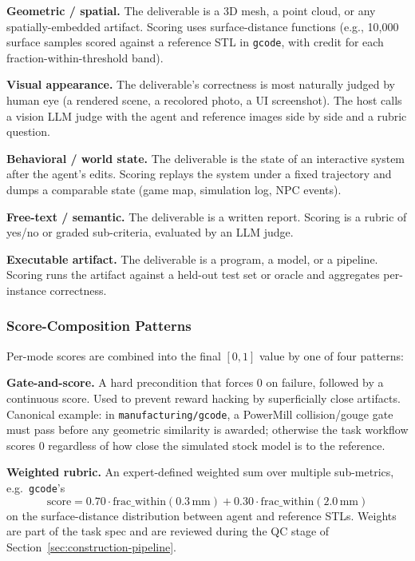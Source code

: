\documentclass{llmxive}
\begin{document}
\noindent \textbf{Geometric / spatial.} The deliverable is a 3D mesh, a point cloud, or any spatially-embedded artifact. Scoring uses surface-distance functions (e.g., 10{,}000 surface samples scored against a reference STL in \texttt{gcode}, with credit for each fraction-within-threshold band).

\noindent \textbf{Visual appearance.} The deliverable's correctness is most naturally judged by human eye (a rendered scene, a recolored photo, a UI screenshot). The host calls a vision LLM judge with the agent and reference images side by side and a rubric question.

\noindent \textbf{Behavioral / world state.} The deliverable is the state of an interactive system after the agent's edits. Scoring replays the system under a fixed trajectory and dumps a comparable state (game map, simulation log, NPC events).

\noindent \textbf{Free-text / semantic.} The deliverable is a written report. Scoring is a rubric of yes/no or graded sub-criteria, evaluated by an LLM judge.

\noindent \textbf{Executable artifact.} The deliverable is a program, a model, or a pipeline. Scoring runs the artifact against a held-out test set or oracle and aggregates per-instance correctness.

\subsubsection{Score-Composition Patterns}
\label{app:eval-composition}

Per-mode scores are combined into the final $[0, 1]$ value by one of four patterns:

\noindent \textbf{Gate-and-score.} A hard precondition that forces $0$ on failure, followed by a continuous score. Used to prevent reward hacking by superficially close artifacts. Canonical example: in \texttt{manufacturing/gcode}, a PowerMill collision/gouge gate must pass before any geometric similarity is awarded; otherwise the task workflow scores $0$ regardless of how close the simulated stock model is to the reference.

\noindent \textbf{Weighted rubric.} An expert-defined weighted sum over multiple sub-metrics, e.g.\ \texttt{gcode}'s
\[
    \text{score} = 0.70 \cdot \mathrm{frac\_within}(0.3\,\text{mm}) + 0.30 \cdot \mathrm{frac\_within}(2.0\,\text{mm})
\]
on the surface-distance distribution between agent and reference STLs. Weights are part of the task spec and are reviewed during the QC stage of Section~\ref{sec:construction-pipeline}.
\end{document}
